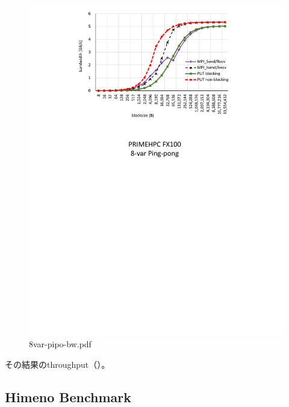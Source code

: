 \begin{figure}
  \begin{center}
    \mbox{\includegraphics[trim=40mm 180mm 43mm 0mm, scale=0.8,clip]{figs/8var-pipo-bw.pdf}}
    \caption{8var-pipo-bw.pdf}\label{fig:8var-pipo-bw}
  \end{center}
\end{figure}

その結果のthroughput（）。



\subsection{Himeno Benchmark}

